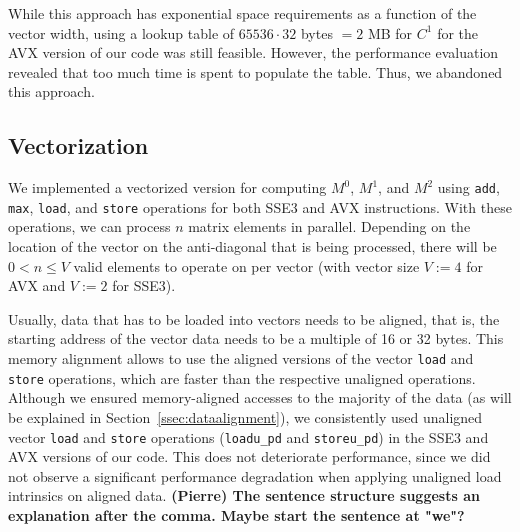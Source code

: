\documentclass[runningheads,a4paper]{llncs}
\begin{document}
While this approach has exponential space requirements as a function of the vector width, using a lookup table of $65536 \cdot 32$ bytes $= 2$ MB for $C^1$ for 
the AVX version of our code was still feasible. 
However, the performance evaluation revealed that too much time is spent to populate the table. 
Thus, we abandoned this approach.



\subsection{Vectorization}
\label{ssec:vectorization}

We implemented a vectorized version for computing 
$M^0$, $M^1$, and $M^2$ using \texttt{add}, \texttt{max}, \texttt{load}, and \texttt{store}
operations for both SSE3 and AVX instructions.  
With these operations, we can process $n$ matrix elements in parallel.  
Depending on the location of the vector on the anti-diagonal that is being processed, there will be $0 < n \leq V$ valid elements to operate on 
per vector (with vector size $V := 4$ for AVX and $V := 2$ for SSE3). 

Usually, data that has to be loaded into vectors needs to be aligned, that is, the starting %
address of the vector data needs to be a multiple of 16 or 32 bytes. This memory alignment allows to
use the aligned versions of the vector \texttt{load} and \texttt{store} operations,
which are faster than the respective unaligned operations.
Although we ensured memory-aligned accesses to the majority of the data (as will be explained in
Section~\ref{ssec:dataalignment}), we consistently used unaligned vector \texttt{load} and \texttt{store}
operations (\texttt{loadu\_pd} and \texttt{storeu\_pd}) in the SSE3 and AVX versions of our code. 
This does not deteriorate performance, since we did not observe a significant performance degradation when
applying unaligned load intrinsics on aligned data. \textbf{(Pierre) The sentence structure suggests an explanation after the comma. Maybe start the sentence at "we"?}
\end{document}
